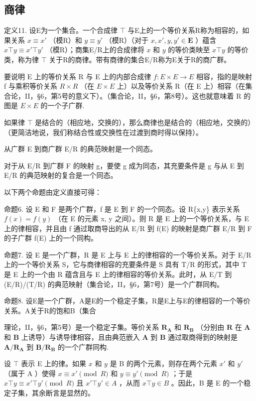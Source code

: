 \subsection{商律}

定义11. 设E为一个集合。一个合成律 \(\top\) 与E上的一个等价关系R称为相容的，如果关系 \(x \equiv x'\) （模R）和 \(y \equiv y'\) （模R）（对于 \(x, x', y, y' \in \mathbf{E}\) ）蕴含 \(x \top y \equiv x' \top y'\) （模R）；商集E/R上的合成律将 \(x\) 和 \(y\) 的等价类映至 \(x \top y\) 的等价类，称为律 \(\top\) 关于R的商律。带有商律的集合E/R称为E关于R的商广群。

要说明 E 上的等价关系 R 与 E 上的内部合成律 \(f: E \times E \to E\) 相容，指的是映射 f 与乘积等价关系 \(R \times R\) （在 \(E \times E\) 上）以及等价关系 R（在 E 上）相容（在集合论，II，§6，第5号的意义下）。（集合论，II，§6，第8号）。这也就意味着 R 的图是 \(E \times E\) 的一个子广群.

如果律 \(\top\) 是结合的（相应地，交换的），那么商律也是结合的（相应地，交换的）（更简洁地说，我们称结合性或交换性在过渡到商时得以保持）。

从广群 E 到商广群 E/R 的典范映射是一个同态。

对于从 E/R 到广群 F 的映射 g，要使 g 成为同态，其充要条件是 g 与从 E 到 E/R 的典范映射的复合是一个同态。

以下两个命题由定义直接可得：

命题6. 设 E 和 F 是两个广群，f 是 E 到 F 的一个同态。设 R\{x,y\} 表示关系 \(f(x)=f(y)\) （在 E 的元素 x, y 之间）。则 R 是 E 上的一个等价关系，与 E 上的律相容，并且由 f 通过取商导出的从 E/R 到 f(E) 的映射是商广群 E/R 到 F 的子广群 f(E) 上的一个同构。

命题7. 设 E 是一个广群，R 是 E 上与 E 上的律相容的一个等价关系。对于 E/R 上的一个等价关系 S，它与商律相容的充要条件是 S 具有 T/R 的形式，其中 T 是 E 上的一个由 R 蕴含且与 E 上的律相容的等价关系。此时，从 E/T 到 (E/R)/(T/R) 的典范映射（集合论，II，§6，第7号）是一个广群同构。

命题8. 设E是一个广群，A是E的一个稳定子集，R是E上与E的律相容的一个等价关系。A关于R的饱和B（集合

理论，II，§6，第5号）是一个稳定子集。等价关系 \(\mathbf{R}_{\mathbf{A}}\) 和 \(\mathbf{R}_{\mathbf{B}}\) （分别由 \(\mathbf{R}\) 在 \(\mathbf{A}\) 和 \(\mathbf{B}\) 上诱导）与诱导律相容，且由典范嵌入 \(\mathbf{A}\) 到 \(\mathbf{B}\) 通过取商得到的映射是 \(\mathbf{A} / \mathbf{R}_{\mathbf{A}}\) 到 \(\mathbf{B} / \mathbf{R}_{\mathbf{B}}\) 的一个广群同构.

设 \(\top\) 表示 E 上的律。如果 \(x\) 和 \(y\) 是 B 的两个元素，则存在两个元素 \(x'\) 和 \(y'\) （属于 A ）使得 \(x \equiv x' \pmod{R}\) 和 \(y \equiv y' \pmod{R}\) ；于是 \(x \top y \equiv x' \top y' \pmod{R}\) 且 \(x' \top y' \in A\) ，从而 \(x \top y \in B\) 。因此，B 是 E 的一个稳定子集，其余断言是显然的。

